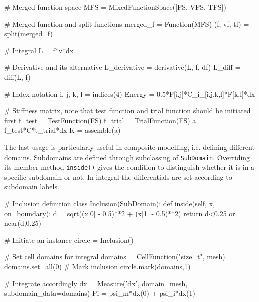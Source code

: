 \documentclass[10pt,a4paper]{scrreprt}
\begin{document}
\begin{python}
# Merged function space
MFS = MixedFunctionSpace([FS, VFS, TFS])

# Merged function and split functions
merged_f = Function(MFS)
(f, vf, tf) = split(merged_f)

# Integral
L = f*v*dx

# Derivative and its alternative
L_derivative = derivative(L, f, df)
L_diff = diff(L, f)

# Index notation
i, j, k, l = indices(4)
Energy = 0.5*F[i,j]*C_i_[i,j,k,l]*F[k,l]*dx

# Stiffness matrix, note that test function and trial function should be initiated first
f_test = TestFunction(FS)
f_trial = TrialFunction(FS)
a = f_test*C*t_trial*dx
K = assemble(a)
\end{python}

The last usage is particularly useful in composite modelling, i.e. defining different domains. Subdomains are defined through subclassing of \texttt{SubDomain}. Overriding its member method \texttt{inside()} gives the condition to distinguish whether it is in a specific subdomain or not. In integral the differentials are set according to subdomain labels.

\begin{python}
# Inclusion definition
class Inclusion(SubDomain):
    def inside(self, x, on_boundary):
        d = sqrt((x[0] - 0.5)**2 + (x[1] - 0.5)**2)
        return d<0.25 or near(d,0.25)

# Initiate an instance
circle = Inclusion()

# Set cell domains for integral
domains = CellFunction("size_t", mesh)
domains.set_all(0)
# Mark inclusion
circle.mark(domains,1)

# Integrate accordingly
dx = Measure('dx', domain=mesh, subdomain_data=domains)
Pi = psi_m*dx(0) + psi_i*dx(1)
\end{python}
\end{document}
